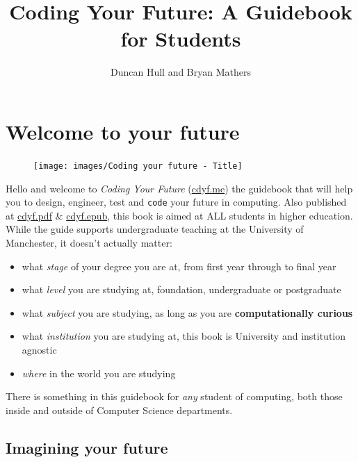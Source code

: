 \documentclass[
]{book}
\title{Coding Your Future: A Guidebook for Students}
\author{Duncan Hull and Bryan Mathers}
\date{}
\providecommand{\tightlist}{%
  \setlength{\itemsep}{0pt}\setlength{\parskip}{0pt}}
\begin{document}
\maketitle

{
\setcounter{tocdepth}{1}
\tableofcontents
}
\hypertarget{welcome}{%
\chapter*{Welcome to your future}\label{welcome}}

\begin{figure}

{\centering \texttt{[image: images/Coding your future - Title]} 

}

\end{figure}

Hello and welcome to \emph{Coding Your Future} (\href{https://www.cdyf.me}{cdyf.me}) the guidebook that will help you to design, engineer, test and \texttt{code} your future in computing. Also published at \href{https://www.cdyf.me/cdyf.pdf}{cdyf.pdf} \& \href{https://www.cdyf.me/cdyf.epub}{cdyf.epub}, this book is aimed at ALL students in higher education. While the guide supports undergraduate teaching at the University of Manchester, it doesn't actually matter:

\begin{itemize}
\tightlist
\item
  what \emph{stage} of your degree you are at, from first year through to final year
\item
  what \emph{level} you are studying at, foundation, undergraduate or postgraduate
\item
  what \emph{subject} you are studying, as long as you are \textbf{computationally curious}
\item
  what \emph{institution} you are studying at, this book is University and institution agnostic
\item
  \emph{where} in the world you are studying
\end{itemize}

There is something in this guidebook for \emph{any} student of computing, both those inside and outside of Computer Science departments. 👨🏿‍💻👨‍💻👩🏽‍💻👩‍💻👩🏿‍💻

\hypertarget{picturethis}{%
\section{Imagining your future}\label{picturethis}}
\end{document}

